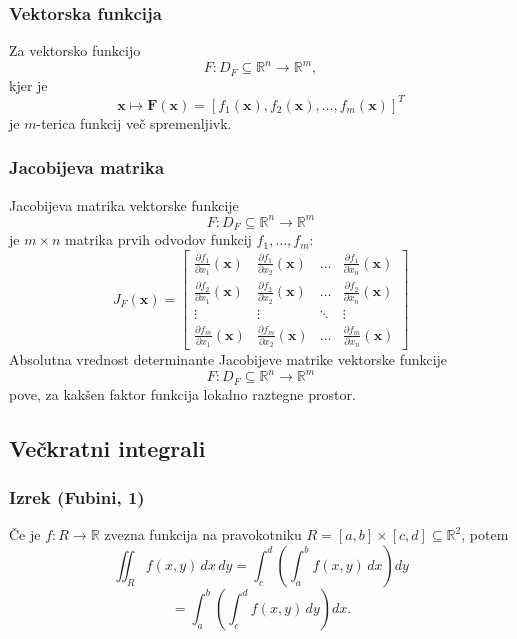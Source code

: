 \documentclass{article}
\begin{document}
\begin{multicols}{2}
	\subsubsection{Vektorska funkcija}
	Za vektorsko funkcijo
	\[ F: D_F \subseteq \mathbb{R}^n \rightarrow \mathbb{R}^m, \]
	kjer je
	\[ \mathbf{x} \mapsto \mathbf{F}(\mathbf{x}) = [f_1(\mathbf{x}), f_2(\mathbf{x}), \ldots, f_m(\mathbf{x})]^T \]
	je \( m \)-terica funkcij več spremenljivk.

	\subsubsection{Jacobijeva matrika}
	Jacobijeva matrika vektorske funkcije
	\[ F: D_F \subseteq \mathbb{R}^n \rightarrow \mathbb{R}^m \]
	je \( m \times n \) matrika prvih odvodov funkcij \( f_1, \ldots, f_m \):
	\[
		J_F(\mathbf{x}) = \begin{bmatrix}
			\frac{\partial f_1}{\partial x_1}(\mathbf{x}) & \frac{\partial f_1}{\partial x_2}(\mathbf{x}) & \ldots & \frac{\partial f_1}{\partial x_n}(\mathbf{x}) \\
			\frac{\partial f_2}{\partial x_1}(\mathbf{x}) & \frac{\partial f_2}{\partial x_2}(\mathbf{x}) & \ldots & \frac{\partial f_2}{\partial x_n}(\mathbf{x}) \\
			\vdots                                        & \vdots                                        & \ddots & \vdots                                        \\
			\frac{\partial f_m}{\partial x_1}(\mathbf{x}) & \frac{\partial f_m}{\partial x_2}(\mathbf{x}) & \ldots & \frac{\partial f_m}{\partial x_n}(\mathbf{x})
		\end{bmatrix}
	\]
	Absolutna vrednost determinante Jacobijeve matrike vektorske funkcije
	\[ F: D_F \subseteq \mathbb{R}^n \rightarrow \mathbb{R}^m \]
	pove, za kakšen faktor funkcija lokalno raztegne prostor.

	\subsection{Večkratni integrali}

	\subsubsection{Izrek (Fubini, 1)}
	Če je \( f: R \rightarrow \mathbb{R} \) zvezna funkcija na pravokotniku \( R = [a, b] \times [c, d] \subseteq \mathbb{R}^2 \), potem
	\[
		\iint_R f(x,y) \,dx\,dy = \int_c^d \left( \int_a^b f(x,y) \,dx \right) dy
	\]
	\[
		= \int_a^b \left( \int_c^d f(x,y) \,dy \right) dx.
	\]



\end{multicols}
\end{document}
